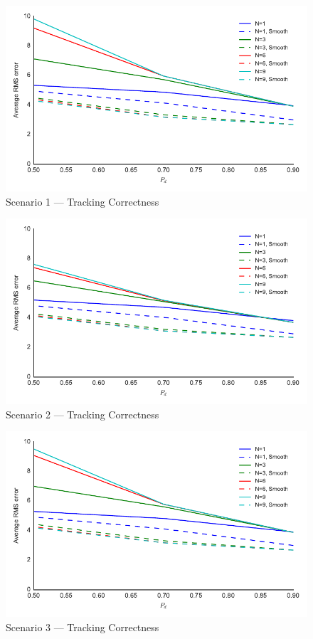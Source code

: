 \begin{figure}
\centering
\includegraphics{Figures/plots/Scenario1_Tracking-TrackingCorrectness.pdf}
\caption{Scenario 1 --- Tracking Correctness}\label{fig:scenario1_tracking_correctness}
\end{figure}
\begin{figure}
\includegraphics{Figures/plots/Scenario2_Tracking-TrackingCorrectness.pdf}
\caption{Scenario 2 --- Tracking Correctness}\label{fig:scenario2_tracking_correctness}
\end{figure}
\begin{figure}
\centering
\includegraphics{Figures/plots/Scenario3_Tracking-TrackingCorrectness.pdf}
\caption{Scenario 3 --- Tracking Correctness}\label{fig:scenario3_tracking_correctness}
\end{figure}
